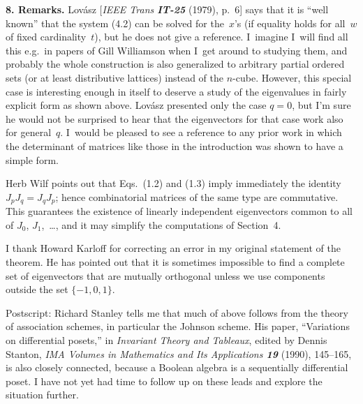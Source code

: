 \medskip\noindent
{\bf 8. Remarks.}\quad
Lov\'asz 
[{\sl IEEE Trans\/ \bf IT-25} (1979), p.~6]
says that it is ``well known'' that the system (4.2) can be solved for
the~$x$'s (if equality holds for all~$w$ of fixed cardinality~$t$),
 but he does not give a reference.
I~imagine I~will find all this e.g.\ in papers of Gill Williamson when
I~get around to studying them, and probably the whole construction is
also generalized to arbitrary partial ordered sets (or at least
distributive lattices) instead of the $n$-cube. However, this special
case is interesting enough in itself to deserve a study of the
eigenvalues in fairly explicit form as shown above. 
Lov\'asz presented only the
case $q=0$, but I'm sure he would not be surprised to hear that the
eigenvectors for that case work also for general~$q$. I~would be
pleased to see a reference to any prior work in which the determinant
of matrices like those in the introduction was shown to have a simple
form. 

Herb Wilf points out that Eqs.~(1.2) and (1.3) imply immediately the
identity $J_pJ_q=J_qJ_p$; hence combinatorial matrices of the same
type are commutative. This guarantees the existence of linearly
independent eigenvectors common to all of $J_0$, $J_1$,~\dots, and it
may simplify the computations of Section~4.

I thank Howard Karloff for correcting an error in my original
statement of the theorem. He has pointed out that it is sometimes
impossible to find a complete set of eigenvectors that are mutually
orthogonal unless we use components outside the set $\{-1,0,1\}$.

Postscript: Richard Stanley tells me that much of above follows from
the theory of association schemes, in particular the Johnson
scheme. His paper, ``Variations on differential posets,'' in {\sl
Invariant Theory and Tableaux}, edited by Dennis Stanton, {\sl IMA
Volumes in Mathematics and Its Applications\/ \bf19} (1990), 145--165,
is also closely connected, because a Boolean algebra is a sequentially
differential poset. I have not yet had time to follow up on these
leads and explore the situation further.

\bye